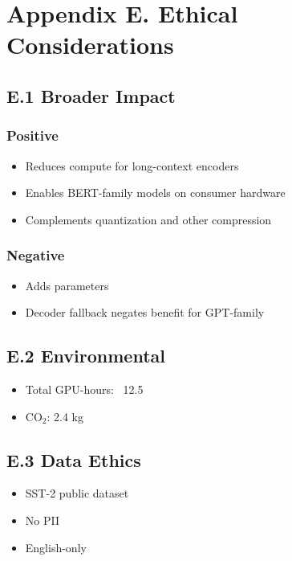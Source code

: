 \section{Appendix E. Ethical Considerations}

\subsection{E.1 Broader Impact}

\subsubsection{Positive}
\begin{itemize}
\item Reduces compute for long-context encoders
\item Enables BERT-family models on consumer hardware
\item Complements quantization and other compression

\end{itemize}
\subsubsection{Negative}
\begin{itemize}
\item Adds parameters
\item Decoder fallback negates benefit for GPT-family

\end{itemize}
\subsection{E.2 Environmental}

\begin{itemize}
\item Total GPU-hours: ~12.5
\item CO$_2$: 2.4 kg

\end{itemize}
\subsection{E.3 Data Ethics}

\begin{itemize}
\item SST-2 public dataset
\item No PII
\item English-only

\end{itemize}
